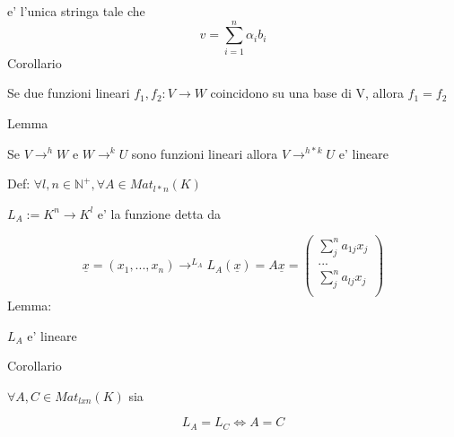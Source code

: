 \documentclass{article}
\begin{document}
e' l'unica stringa tale che
\begin{equation*}
  v= \sum^n_{i=1} \alpha_i b_i
\end{equation*}
Corollario
\begin{flushleft}
 Se due funzioni lineari $f_1,f_2: V \to W$ coincidono su una base di V, allora $f_1=f_2$ 
\end{flushleft}
Lemma
\begin{flushleft}
  Se $V \to^h W$ e $W \to^k U$ sono funzioni lineari allora $V \to^{h*k} U$ e' lineare
\end{flushleft}
\begin{flushleft}
  Def: $\forall l,n \in \mathbb{N}^+, \forall A \in Mat_{l*n}(K)$
\end{flushleft}
\begin{flushleft}
  $L_A := K^n \to K^l$ e' la funzione detta da 
\end{flushleft}
\begin{equation*}
  \underline{x}=(x_1,...,x_n) \to^{L_A} L_A(\underline{x})= A\underline{x}=\begin{pmatrix}
    \sum^n_j a_{1j}x_j \\
    ... \\
    \sum^n_j a_{lj}x_j \\
  \end{pmatrix}
\end{equation*}
Lemma:
\begin{flushleft}
  $L_A$ e' lineare
\end{flushleft}
Corollario
\begin{flushleft}
  $\forall A,C \in Mat_{lxn}(K)$ sia 
\end{flushleft}
\begin{equation*}
  L_A=L_C \iff A=C
\end{equation*}
\end{document}
